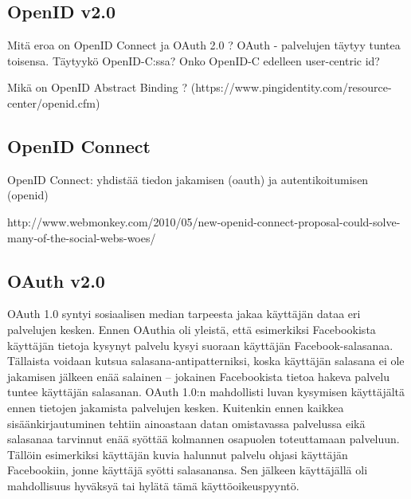\documentclass[finnish,gradu]{tktltiki}
\begin{document}
  \subsection{OpenID v2.0} %
  \label{sub:openid}
  Mitä eroa on OpenID Connect ja OAuth 2.0 ?
  OAuth - palvelujen täytyy tuntea toisensa. Täytyykö OpenID-C:ssa?
  Onko OpenID-C edelleen user-centric id?

  Mikä on OpenID Abstract Binding ? (https://www.pingidentity.com/resource-center/openid.cfm)


  \subsection{OpenID Connect} %
  \label{sub:openid_connect}
  OpenID Connect: yhdistää tiedon jakamisen (oauth) ja autentikoitumisen (openid)

  http://www.webmonkey.com/2010/05/new-openid-connect-proposal-could-solve-many-of-the-social-webs-woes/



  \subsection{OAuth v2.0} %
  \label{sub:oauth}

  OAuth 1.0 syntyi sosiaalisen median tarpeesta jakaa käyttäjän dataa eri palvelujen kesken. Ennen OAuthia oli yleistä, että esimerkiksi Facebookista käyttäjän tietoja kysynyt palvelu kysyi suoraan käyttäjän Facebook-salasanaa. Tällaista voidaan kutsua salasana-antipatterniksi, koska käyttäjän salasana ei ole jakamisen jälkeen enää salainen -- jokainen Facebookista tietoa hakeva palvelu tuntee käyttäjän salasanan. OAuth 1.0:n mahdollisti luvan kysymisen käyttäjältä ennen tietojen jakamista palvelujen kesken. Kuitenkin ennen kaikkea sisäänkirjautuminen tehtiin ainoastaan datan omistavassa palvelussa eikä salasanaa tarvinnut enää syöttää kolmannen osapuolen toteuttamaan palveluun. Tällöin esimerkiksi käyttäjän kuvia halunnut palvelu ohjasi käyttäjän Facebookiin, jonne käyttäjä syötti salasanansa. Sen jälkeen käyttäjällä oli mahdollisuus hyväksyä tai hylätä tämä käyttöoikeuspyyntö.
\end{document}
